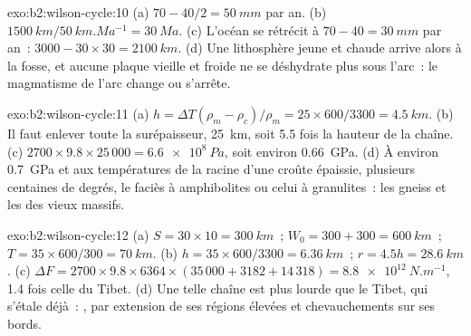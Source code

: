 \begin{solution}{exo:b2:wilson-cycle:10}
(a) $70 - 40/2 = \qty{50}{mm}$ par an. (b) $\qty{1500}{km}/\qty{50}{km.Ma^{-1}} =
\qty{30}{Ma}$. (c) L'océan se rétrécit à $70 - 40 = \qty{30}{mm}$ par an~: $3000 - 30\times30 =
\qty{2100}{km}$. (d) Une lithosphère jeune et chaude arrive alors à la fosse, et aucune plaque vieille et froide
ne se déshydrate plus sous l'arc~: le magmatisme de l'arc change ou s'arrête.
\end{solution}

\begin{solution}{exo:b2:wilson-cycle:11}
(a) $h = \Delta T(\rho_m - \rho_c)/\rho_m = 25\times600/3300 = \qty{4.5}{km}$. (b) Il faut enlever toute la
surépaisseur, \qty{25}{km}, soit 5.5 fois la hauteur de la chaîne. (c) $2700\times9.8\times25\,000 =
\qty{6.6e8}{Pa}$, soit environ \qty{0.66}{GPa}. (d) À environ \qty{0.7}{GPa} et aux températures de
la racine d'une croûte épaissie, plusieurs centaines de degrés, le faciès à amphibolites ou celui à
granulites~: les gneiss et les  des vieux massifs.
\end{solution}

\begin{solution}{exo:b2:wilson-cycle:12}
(a) $S = 30\times10 = \qty{300}{km}$~; $W_0 = 300 + 300 = \qty{600}{km}$~; $T = 35\times600/300 =
\qty{70}{km}$. (b) $h = 35\times600/3300 = \qty{6.36}{km}$~; $r = 4.5h = \qty{28.6}{km}$.
(c) $\Delta F = 2700\times9.8\times6364\times(35\,000 + 3182 + 14\,318) =
\qty{8.8e12}{N.m^{-1}}$, 1.4 fois celle du Tibet. (d) Une telle chaîne est plus lourde que le Tibet, qui
s'étale déjà~: , par extension de ses régions élevées et chevauchements sur ses bords.
\end{solution}

